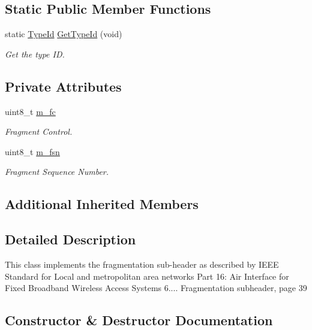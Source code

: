 \subsection*{Static Public Member Functions}
\begin{DoxyCompactItemize}
\item 
static \hyperlink{classns3_1_1TypeId}{Type\+Id} \hyperlink{classns3_1_1FragmentationSubheader_a14270d4d4625fd8d352f6d7da203475e}{Get\+Type\+Id} (void)
\begin{DoxyCompactList}\small\item\em Get the type ID. \end{DoxyCompactList}\end{DoxyCompactItemize}
\subsection*{Private Attributes}
\begin{DoxyCompactItemize}
\item 
uint8\+\_\+t \hyperlink{classns3_1_1FragmentationSubheader_aec8f4c8be60658aa65ebfa777343f299}{m\+\_\+fc}
\begin{DoxyCompactList}\small\item\em Fragment Control. \end{DoxyCompactList}\item 
uint8\+\_\+t \hyperlink{classns3_1_1FragmentationSubheader_a18dcedcaa3d5c0b6d8fb816569404b83}{m\+\_\+fsn}
\begin{DoxyCompactList}\small\item\em Fragment Sequence Number. \end{DoxyCompactList}\end{DoxyCompactItemize}
\subsection*{Additional Inherited Members}


\subsection{Detailed Description}
This class implements the fragmentation sub-\/header as described by I\+E\+EE Standard for Local and metropolitan area networks Part 16\+: Air Interface for Fixed Broadband Wireless Access Systems 6.... Fragmentation subheader, page 39 

\subsection{Constructor \& Destructor Documentation}
